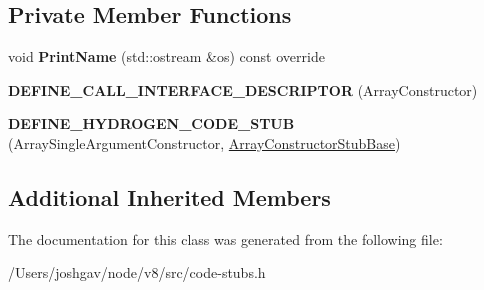 \subsection*{Private Member Functions}
\begin{DoxyCompactItemize}
\item 
void {\bfseries Print\+Name} (std\+::ostream \&os) const  override\hypertarget{classv8_1_1internal_1_1_array_single_argument_constructor_stub_add27a5cb6d26fdae5eab6e8933b4d1b4}{}\label{classv8_1_1internal_1_1_array_single_argument_constructor_stub_add27a5cb6d26fdae5eab6e8933b4d1b4}

\item 
{\bfseries D\+E\+F\+I\+N\+E\+\_\+\+C\+A\+L\+L\+\_\+\+I\+N\+T\+E\+R\+F\+A\+C\+E\+\_\+\+D\+E\+S\+C\+R\+I\+P\+T\+OR} (Array\+Constructor)\hypertarget{classv8_1_1internal_1_1_array_single_argument_constructor_stub_af6bc134fa9108eccbe9f8fd3ac8ecad1}{}\label{classv8_1_1internal_1_1_array_single_argument_constructor_stub_af6bc134fa9108eccbe9f8fd3ac8ecad1}

\item 
{\bfseries D\+E\+F\+I\+N\+E\+\_\+\+H\+Y\+D\+R\+O\+G\+E\+N\+\_\+\+C\+O\+D\+E\+\_\+\+S\+T\+UB} (Array\+Single\+Argument\+Constructor, \hyperlink{classv8_1_1internal_1_1_array_constructor_stub_base}{Array\+Constructor\+Stub\+Base})\hypertarget{classv8_1_1internal_1_1_array_single_argument_constructor_stub_afb1eaea83a6323427ae61c435aa52c96}{}\label{classv8_1_1internal_1_1_array_single_argument_constructor_stub_afb1eaea83a6323427ae61c435aa52c96}

\end{DoxyCompactItemize}
\subsection*{Additional Inherited Members}


The documentation for this class was generated from the following file\+:\begin{DoxyCompactItemize}
\item 
/\+Users/joshgav/node/v8/src/code-\/stubs.\+h\end{DoxyCompactItemize}
